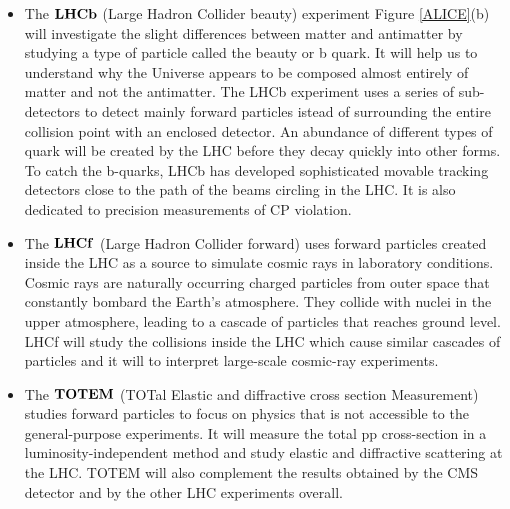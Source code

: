 \begin{itemize}
\item
The $\bf{LHCb}$ (Large Hadron Collider beauty) experiment Figure \ref{ALICE}(b) will investigate the slight differences between matter and antimatter by studying a type of particle called the beauty or b quark. It will help us to understand why the Universe appears to be composed almost entirely of matter and not the antimatter. The LHCb experiment uses a series of sub-detectors to detect mainly forward particles istead of surrounding the entire collision point with an enclosed detector. An abundance of different types of quark will be created by the LHC before they decay quickly into other forms. To catch the b-quarks, LHCb has developed sophisticated movable tracking detectors close to the path of the beams circling in the LHC. It is also dedicated to precision measurements of CP violation.


\item
The $\bf{LHCf}$ (Large Hadron Collider forward) uses forward particles created inside the LHC as a source to simulate cosmic rays in laboratory conditions. Cosmic rays are naturally occurring charged particles from outer space that constantly bombard the Earth's atmosphere. They collide with nuclei in the upper atmosphere, leading to a cascade of particles that reaches ground level. LHCf will study the collisions inside the LHC which cause similar cascades of particles and it will to interpret large-scale cosmic-ray experiments.

\item
The  $\bf{TOTEM}$ (TOTal Elastic and diffractive cross section Measurement) studies forward particles to focus on physics that is not accessible to the general-purpose experiments. It will measure the total pp cross-section in a luminosity-independent method and study elastic and diffractive scattering at the LHC. TOTEM will also complement the results obtained by the CMS detector and by the other LHC experiments overall.

\end{itemize}
